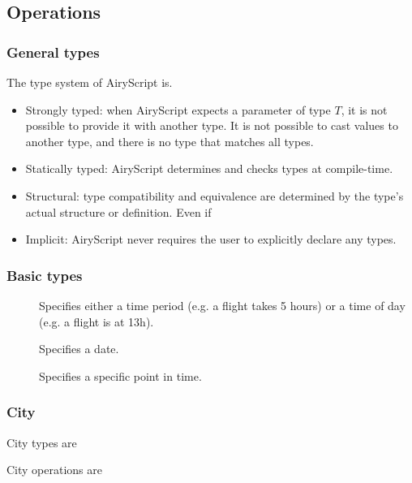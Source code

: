 \subsection{Operations}
\label{sec:operations}
\subsubsection{General types}
The type system of AiryScript is.
\begin{itemize}
  \item Strongly typed: when AiryScript expects a parameter of type $T$, it is
    not possible to provide it with another type. It is not possible to cast
    values to another type, and there is no type that matches all types.
  \item Statically typed: AiryScript determines and checks types at
    compile-time.
  \item Structural: type compatibility and equivalence are determined by the
    type’s actual structure or definition. Even if 
  \item Implicit: AiryScript never requires the user to explicitly declare any
      types.
\end{itemize}


\subsubsection{Basic types}
\begin{description}
  \item[] 

    Specifies either a time period (e.g. a flight takes 5 hours) or a time of
    day (e.g. a flight is at 13h).
  \item[] 

    Specifies a date.
  \item[] 

    Specifies a specific point in time. 
  \item[] 
  \item[] 
\end{description}

\subsubsection{City}
City types are
\begin{description}
  \item[] 
  \item[] 
\end{description}
City operations are



